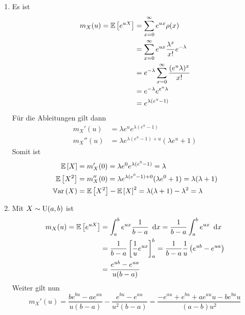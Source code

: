 \begin{exercisePage}[Normalverteilung]
	\begin{enumerate}[label=(zu \alph*), leftmargin=*]
		\item Es ist 
		\begin{equation*}
			\begin{aligned}
			m_X(u) = \EW[e^{uX}] 
			&= \sum_{x=0}^{\infty} e^{ux} \rho(x) \\
			&= \sum_{x=0}^{\infty} e^{ux} \frac{\lambda^x}{x!} e^{-\lambda} \\
			&= e^{-\lambda} \sum_{x=0}^\infty \frac{(e^u \lambda)^x}{x!} \\
			&= e^{-\lambda} e^{e^u \lambda} \\
			&= e^{\lambda (e^u - 1)}
			\end{aligned}
		\end{equation*}
		Für die Ableitungen gilt dann
		\begin{equation*}
			\begin{aligned}
			m_X'(u) &= \lambda e^u e^{\lambda (e^u - 1)}  \\
			m_X''(u) &= \lambda e^{\lambda (e^u - 1) + u} (\lambda e^u + 1)
			\end{aligned}
		\end{equation*}
		Somit ist
		\begin{equation*}
			\begin{aligned}
			\EW[X] &= m_X'(0) = \lambda e^0 e^{\lambda (e^0 - 1)} = \lambda \\
			\EW[X^2] &= m_X''(0) = \lambda e^{\lambda (e^0 - 1) + 0} (\lambda e^0 + 1) = \lambda ( \lambda + 1) \\
			\Var[X] &= \EW[X^2] - \EW[X]^2 = \lambda ( \lambda + 1) - \lambda^2 = \lambda
			\end{aligned}
		\end{equation*}
		\item Mit $X \sim \Uni(a,b)$ ist
		\begin{equation*}
			\begin{aligned}
			m_X(u) 
			= \EW[e^{uX}] 
			&= \int_a^b e^{ux} \frac{1}{b-a} \dx 
			= \frac{1}{b-a} \int_a^b e^{ux} \dx \\ 
			&= \frac{1}{b-a} \left[\frac{1}{u} e^{ux} \right]_a^b 
			= \frac{1}{b-a} \frac{1}{u} \left( e^{ub} - e^{ua} \right) \\
			&= \frac{e^{ub} - e^{ua}}{u (b-a)}
			\end{aligned}
		\end{equation*}
		Weiter gilt nun
		\begin{equation*}
			m_X'(u) = \frac{b e^{b u} - a e^{a u}}{u (b - a)} - \frac{e^{b u} - e^{a u}}{u^2 (b - a)} = \frac{-e^{a u} + e^{b u} + a e^{a u} u - b e^{b u} u}{(a - b) u^2}

\end{equation*}
\end{enumerate}
\end{exercisePage}
